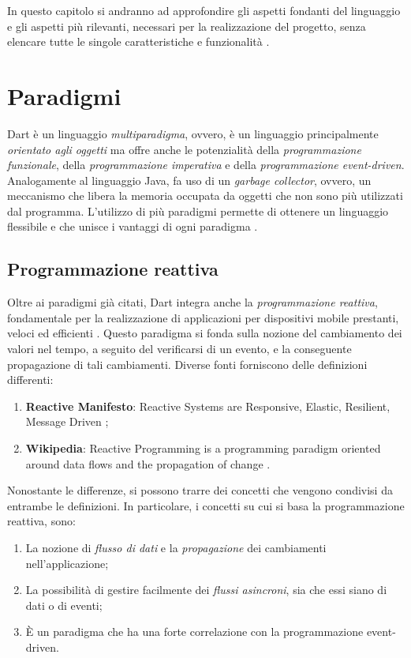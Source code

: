 In questo capitolo si andranno ad approfondire gli aspetti fondanti del linguaggio e gli aspetti più rilevanti, necessari per la realizzazione del progetto, senza elencare tutte le singole caratteristiche e funzionalità \cite{tour_linguaggio}.

\section{Paradigmi}
Dart è un linguaggio \textit{multiparadigma}, ovvero, è un linguaggio principalmente \textit{orientato agli oggetti} ma offre anche le potenzialità della \textit{programmazione funzionale}, della \textit{programmazione imperativa} e della \textit{programmazione event-driven}. Analogamente al linguaggio Java, fa uso di un \textit{garbage collector}, ovvero, un meccanismo che libera la memoria occupata da oggetti che non sono più utilizzati dal programma. L'utilizzo di più paradigmi permette di ottenere un linguaggio flessibile e che unisce i vantaggi di ogni paradigma \cite{dart_paradigm}.

\subsection{Programmazione reattiva}
Oltre ai paradigmi già citati, Dart integra anche la \textit{programmazione reattiva}, fondamentale per la realizzazione di applicazioni per dispositivi mobile prestanti, veloci ed efficienti \cite{dart_paradigm}. 
Questo paradigma si fonda sulla nozione del cambiamento dei valori nel tempo, a seguito del verificarsi di un evento, e la conseguente propagazione di tali cambiamenti. Diverse fonti forniscono delle definizioni differenti:
\begin{enumerate}
	\item \textbf{Reactive Manifesto}: Reactive Systems are Responsive, Elastic, Resilient, Message Driven \cite{reactive_manifesto};
	\item \textbf{Wikipedia}: Reactive Programming is a programming paradigm oriented around data flows and the propagation of change \cite{reactive_programming_wikipedia}.
\end{enumerate}
Nonostante le differenze, si possono trarre dei concetti che vengono condivisi da entrambe le definizioni. In particolare, i concetti su cui si basa la programmazione reattiva, sono:
\begin{enumerate}
	\item La nozione di \textit{flusso di dati} e la \textit{propagazione} dei cambiamenti nell'applicazione;
	\item La possibilità di gestire facilmente dei \textit{flussi asincroni}, sia che essi siano di dati o di eventi;
	\item È un paradigma che ha una forte correlazione con la programmazione event-driven.
\end{enumerate}


